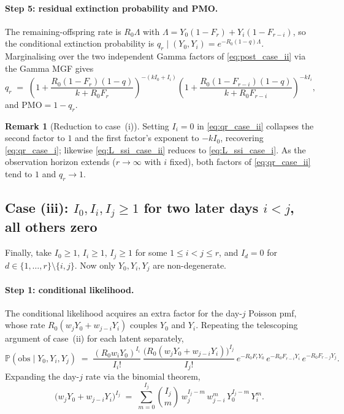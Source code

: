 \documentclass{article}
\theoremstyle{definition}
\newtheorem*{remark}{Remark}
\begin{document}
\paragraph{Step 5: residual extinction probability and PMO.}
The remaining-offspring rate is $R_0 \Lambda$ with
$\Lambda = Y_0(1 - F_r) + Y_i(1 - F_{r-i})$, so the conditional
extinction probability is
$q_r \mid (Y_0, Y_i) = e^{-R_0(1-q)\Lambda}$.  Marginalising over the
two independent Gamma factors of \eqref{eq:post_case_ii} via the Gamma
MGF gives
\begin{equation}\label{eq:qr_case_ii}
  q_r
  \;=\; \left(1 + \frac{R_0(1 - F_r)(1 - q)}{k + R_0 F_r}\right)^{-(k
  I_0 + I_i)}
  \left(1 + \frac{R_0(1 - F_{r-i})(1 - q)}{k + R_0 F_{r-i}}\right)^{-k I_i},
\end{equation}
and $\mathrm{PMO} = 1 - q_r$.

\begin{remark}[Reduction to case~(i)]
  Setting $I_i = 0$ in \eqref{eq:qr_case_ii} collapses the second
  factor to $1$ and the first factor's exponent to $-k I_0$,
  recovering \eqref{eq:qr_case_i}; likewise \eqref{eq:L_ssi_case_ii}
  reduces to \eqref{eq:L_ssi_case_i}.  As the observation horizon
  extends ($r \to \infty$ with $i$ fixed), both factors of
  \eqref{eq:qr_case_ii} tend to $1$ and $q_r \to 1$.
\end{remark}

\subsection{Case (iii): \(I_0, I_i, I_j \geq 1\) for two later days
\(i < j\), all others zero}
\label{sec:ssi_case_iii}

Finally, take $I_0 \geq 1$, $I_i \geq 1$, $I_j \geq 1$ for some
$1 \leq i < j \leq r$, and $I_d = 0$ for
$d \in \{1, \ldots, r\} \setminus \{i, j\}$.  Now only
$Y_0, Y_i, Y_j$ are non-degenerate.

\paragraph{Step 1: conditional likelihood.}
The conditional likelihood acquires an extra factor for the day-$j$
Poisson pmf, whose rate $R_0(w_j Y_0 + w_{j-i} Y_i)$ couples $Y_0$
and $Y_i$.  Repeating the telescoping argument of case~(ii) for each
latent separately,
\begin{equation}\label{eq:cl_case_iii}
  \mathbb{P}(\mathrm{obs} \mid Y_0, Y_i, Y_j)
  \;=\; \frac{(R_0 w_i Y_0)^{I_i}}{I_i!}\,
  \frac{\bigl(R_0(w_j Y_0 + w_{j-i} Y_i)\bigr)^{I_j}}{I_j!}\,
  e^{-R_0 F_r Y_0}\, e^{-R_0 F_{r-i} Y_i}\, e^{-R_0 F_{r-j} Y_j}.
\end{equation}
Expanding the day-$j$ rate via the binomial theorem,
\begin{equation}\label{eq:bin_case_iii}
  \bigl(w_j Y_0 + w_{j-i} Y_i\bigr)^{I_j}
  \;=\; \sum_{m=0}^{I_j} \binom{I_j}{m}\, w_j^{I_j - m}\, w_{j-i}^{m}\,
  Y_0^{I_j - m}\, Y_i^{m}.
\end{equation}
\end{document}
